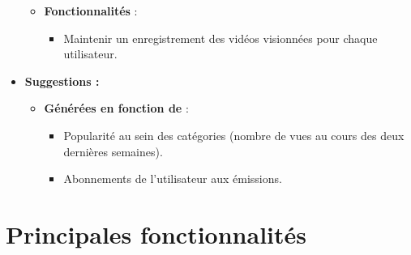 \documentclass[a4paper, 12pt]{article}
\begin{document}
\begin{itemize}
\begin{itemize}
        \item \textbf{Fonctionnalités} :
        \begin{itemize}
            \item Maintenir un enregistrement des vidéos visionnées pour chaque utilisateur.
        \end{itemize}
    \end{itemize}
    \item \textbf{Suggestions :}
    \begin{itemize}
        \item \textbf{Générées en fonction de} :
        \begin{itemize}
            \item Popularité au sein des catégories (nombre de vues au cours des deux dernières semaines).
            \item Abonnements de l'utilisateur aux émissions.
        \end{itemize}
    \end{itemize}
\end{itemize}

\section*{Principales fonctionnalités}
\end{document}
